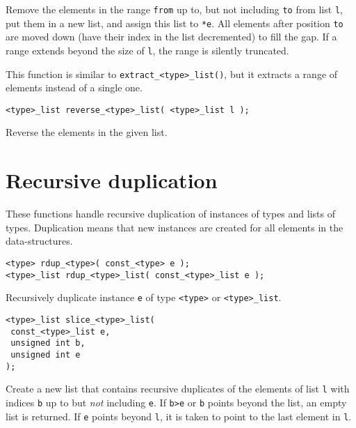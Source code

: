 \begin{desc}
Remove the elements in the range \texttt{from} up to, but not including \texttt{to} from list \texttt{l},
put them in a new list, and assign this list to \verb'*e'.
All elements after position \texttt{to} are moved down
(have their index in the list decremented) to fill the gap.
If a range extends beyond the size of \texttt{l}, the range is silently
truncated.
\par
This function is similar to \verb'extract_<type>_list()', but it
extracts a range of elements instead of a single one.
\end{desc}
\begin{verbatim}
<type>_list reverse_<type>_list( <type>_list l );
\end{verbatim}
\begin{desc}
Reverse the elements in the given list.
\end{desc}
\section{Recursive duplication}
These functions handle recursive duplication of instances of types and
lists of types.
Duplication means that new instances are created for all elements
in the data-structures.
\begin{verbatim}
<type> rdup_<type>( const_<type> e );
<type>_list rdup_<type>_list( const_<type>_list e );
\end{verbatim}
\begin{desc}
Recursively duplicate instance \texttt{e} of type \texttt{<type>} or
\texttt{<type>\_list}.
\end{desc}
\begin{verbatim}
<type>_list slice_<type>_list(
 const_<type>_list e,
 unsigned int b,
 unsigned int e
);
\end{verbatim}
\begin{desc}
Create a new list that contains recursive duplicates of the elements of
list \texttt{l} with indices \texttt{b} up to but \emph{not} including \texttt{e}.
If \texttt{b>e} or \texttt{b} points beyond the list,
an empty list is returned.
If \texttt{e} points beyond \texttt{l},
it is taken to point to the last element in \texttt{l}.
\end{desc}
